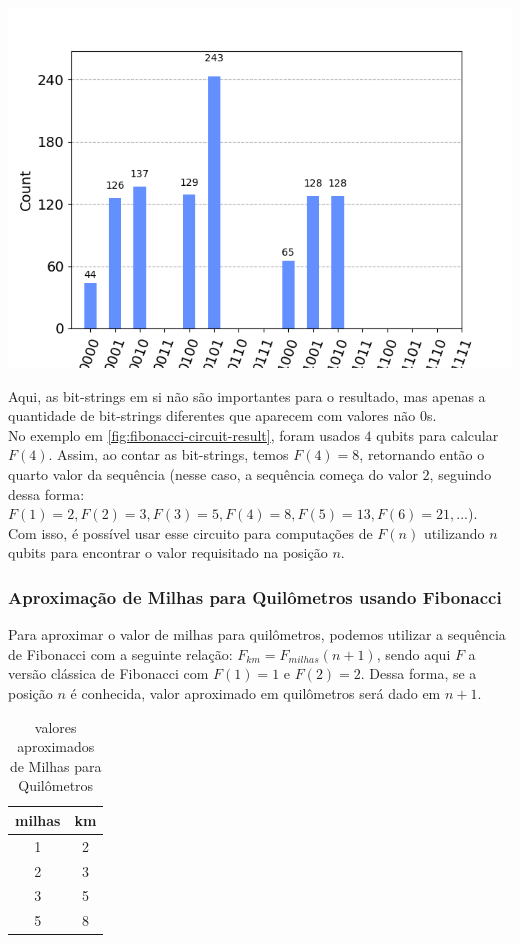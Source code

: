 \documentclass{article}
\begin{document}
\begin{center}
	\includegraphics[scale=0.5]{fibonacci-4.png}
	\label{fig:fibonacci-circuit-result}
\end{center}

Aqui, as bit-strings em si não são importantes para o resultado, mas apenas a quantidade de bit-strings diferentes que aparecem com valores não $0$s.\\ 
No exemplo em \ref{fig:fibonacci-circuit-result}, foram usados $4$ qubits para calcular $F(4)$. Assim, ao contar as bit-strings, temos $F(4) = 8$, retornando então o quarto valor da sequência (nesse caso, a sequência começa do valor $2$, seguindo dessa forma: $F(1)=2, F(2)=3, F(3)=5, F(4)=8, F(5)=13, F(6)=21, ...$). \\
Com isso, é possível usar esse circuito para computações de $F(n)$ utilizando $n$ qubits para encontrar o valor requisitado na posição $n$.

\subsubsection{Aproximação de Milhas para Quilômetros usando Fibonacci}

Para aproximar o valor de milhas para quilômetros, podemos utilizar a sequência de Fibonacci com a seguinte relação: $F_{km} = F_{milhas}(n+1)$, sendo aqui $F$ a versão clássica de Fibonacci com $F(1) = 1$ e $F(2) = 2$. Dessa forma, se a posição $n$ é conhecida, valor aproximado em quilômetros será dado em $n+1$.


\begin{table}[!h]
	\begin{center}
		\begin{tabular}{ |c|c| } 
			\hline
			milhas & km \\
			\hline
			1 & 2 \\
			\hline
			2 & 3 \\
			\hline
			3 & 5 \\
			\hline
			5 & 8 \\
			\hline
		\end{tabular}
	\caption{valores aproximados de Milhas para Quilômetros}
	\end{center}
\end{table}
\end{document}
